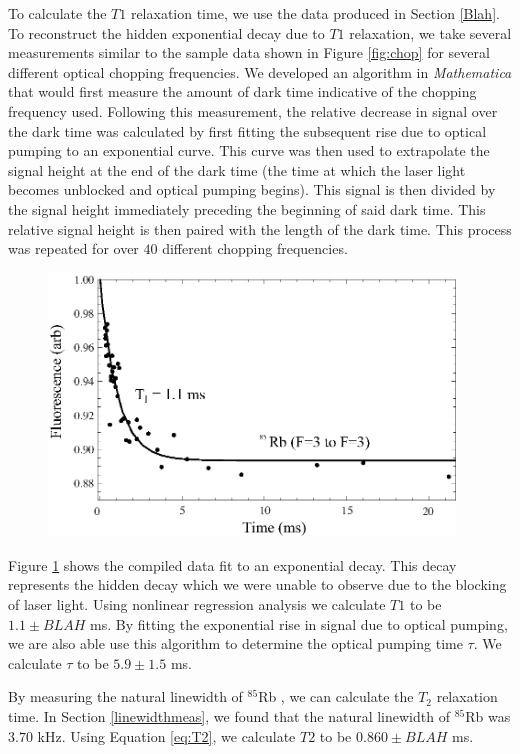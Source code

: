 To calculate the $T1$ relaxation time, we use the data produced in Section \ref{Blah}.  To reconstruct the hidden exponential decay due to $T1$ relaxation, we take several measurements similar to the sample data shown in Figure \ref{fig:chop} for several different optical chopping frequencies.  We developed an algorithm in \emph{Mathematica} that would first measure the amount of dark time indicative of the chopping frequency used.  Following this measurement, the relative decrease in signal over the dark time was calculated by first fitting the subsequent rise due to optical pumping to an exponential curve.  This curve was then used to extrapolate the signal height at the end of the dark time (the time at which the laser light becomes unblocked and optical pumping begins).  This signal is then divided by the signal height immediately preceding the beginning of said dark time.  This relative signal height is then paired with the length of the dark time.  This process was repeated for over $40$ different chopping frequencies.  
\begin{figure}[htbp]
\begin{center}
\includegraphics[height=70mm]{./figures/T1.eps}
\caption{\small{}}
\label{fig:T1}
\end{center}
\end{figure}
Figure \ref{fig:T1} shows the compiled data fit to an exponential decay.  This decay represents the hidden decay which we were unable to observe due to the blocking of laser light.  Using nonlinear regression analysis we calculate $T1$ to be $1.1 \pm BLAH$ ms.  By fitting the exponential rise in signal due to optical pumping, we are also able use this algorithm to determine the optical pumping time $\tau$. We calculate $\tau$ to be  $5.9 \pm 1.5$ ms.  

By measuring the natural linewidth of $^{85}$Rb , we can calculate the $T_2$ relaxation time.  In Section \ref{linewidthmeas}, we found that the natural linewidth of $^{85}$Rb was $3.70$ kHz.  Using Equation \ref{eq:T2}, we calculate $T2$ to be $0.860 \pm BLAH$ ms. 

